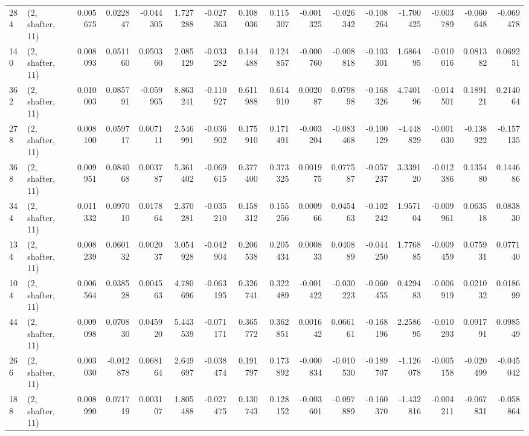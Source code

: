 \begin{tabular}{llrrrrrrrrrrrrrr}
284 &  (2, shafter, 11) &   0.005675 &  0.022847 & -0.044305 &    1.727288 & -0.027363 &   0.108036 &  0.115307 & -0.001325 & -0.026342 & -0.108264 &   -1.700425 & -0.003789 & -0.060648 & -0.069478 \\
140 &  (2, shafter, 11) &   0.008093 &  0.051160 &  0.050360 &    2.085129 & -0.033282 &   0.144488 &  0.124857 & -0.000760 & -0.008818 & -0.103301 &    1.686495 & -0.010016 &  0.081382 &  0.069251 \\
362 &  (2, shafter, 11) &   0.010003 &  0.085791 & -0.059965 &    8.863241 & -0.110927 &   0.611988 &  0.614910 &  0.002087 &  0.079898 & -0.168326 &    4.740196 & -0.014501 &  0.189121 &  0.214064 \\
278 &  (2, shafter, 11) &   0.008100 &  0.059717 &  0.007111 &    2.546991 & -0.036902 &   0.175910 &  0.171491 & -0.003204 & -0.083468 & -0.100129 &   -4.448829 & -0.001030 & -0.138922 & -0.157135 \\
368 &  (2, shafter, 11) &   0.009951 &  0.084068 &  0.003787 &    5.361402 & -0.069615 &   0.377400 &  0.373325 &  0.001975 &  0.077587 & -0.057237 &    3.339120 & -0.012386 &  0.135480 &  0.144686 \\
344 &  (2, shafter, 11) &   0.011332 &  0.097010 &  0.017864 &    2.370281 & -0.035210 &   0.158312 &  0.155256 &  0.000966 &  0.045463 & -0.102242 &    1.957104 & -0.009961 &  0.063518 &  0.083830 \\
134 &  (2, shafter, 11) &   0.008239 &  0.060132 &  0.002037 &    3.054928 & -0.042904 &   0.206538 &  0.205434 &  0.000833 &  0.040889 & -0.044250 &    1.776885 & -0.009459 &  0.075931 &  0.077140 \\
104 &  (2, shafter, 11) &   0.006564 &  0.038528 &  0.004563 &    4.780696 & -0.063195 &   0.326741 &  0.322489 & -0.001422 & -0.030223 & -0.060455 &    0.429483 & -0.006919 &  0.021032 &  0.018699 \\
44  &  (2, shafter, 11) &   0.009098 &  0.070830 &  0.045920 &    5.443539 & -0.071171 &   0.365772 &  0.362851 &  0.001642 &  0.066161 & -0.168196 &    2.258695 & -0.010293 &  0.091791 &  0.098549 \\
266 &  (2, shafter, 11) &   0.003030 & -0.012878 &  0.068164 &    2.649697 & -0.038474 &   0.191797 &  0.173892 & -0.000834 & -0.010530 & -0.189707 &   -1.126078 & -0.005158 & -0.020499 & -0.045042 \\
188 &  (2, shafter, 11) &   0.008990 &  0.071719 &  0.003107 &    1.805488 & -0.027475 &   0.130743 &  0.128152 & -0.003601 & -0.097889 & -0.160370 &   -1.432816 & -0.004211 & -0.067831 & -0.058864 \\

\end{tabular}
